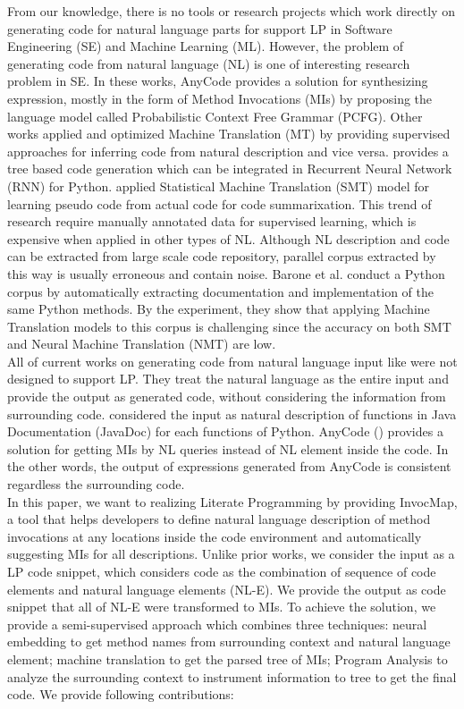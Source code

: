 \documentclass[sigconf,review,anonymous]{article}
\begin{document}
From our knowledge, there is no tools or research projects which work directly on generating code for natural language parts for support LP in Software Engineering (SE) and Machine Learning (ML). However, the problem of generating code from natural language (NL) is one of interesting research problem in SE. In these works, AnyCode \cite{007} provides a solution for synthesizing expression, mostly in the form of Method Invocations (MIs) by proposing the language model called Probabilistic Context Free Grammar (PCFG). Other works applied and optimized Machine Translation (MT) by providing supervised approaches for inferring code from natural description and vice versa. \cite{008} provides a tree based code generation which can be integrated in Recurrent Neural Network (RNN) for Python. \cite{009} applied Statistical Machine Translation (SMT) model for learning pseudo code from actual code for code summarixation. This trend of research require manually annotated data for supervised learning, which is expensive when applied in other types of NL. Although NL description and code can be extracted from large scale code repository, parallel corpus extracted by this way is usually erroneous and contain noise.  Barone  et al. \cite{010} conduct a Python corpus by automatically extracting documentation and implementation of the same Python methods. By the experiment, they show that applying Machine Translation models to this corpus is challenging since the accuracy on both SMT and Neural Machine Translation (NMT) are low.
\\
All of current works on generating code from natural language input like \cite{007,008,009,010} were not designed to support LP. They treat the natural language as the entire input and provide the output as generated code, without considering the information from surrounding code. \cite{010} considered the input as natural description of functions in Java Documentation (JavaDoc) for each functions of Python. AnyCode (\cite{007}) provides a solution for getting MIs by NL queries instead of NL element inside the code. In the other words, the output of expressions generated from AnyCode is consistent regardless the surrounding code.
\\
In this paper, we want to realizing Literate Programming by providing InvocMap, a tool that helps developers to define natural language description of method invocations at any locations inside the code environment and automatically suggesting MIs for all descriptions. Unlike prior works, we consider the input as a LP code snippet, which considers code as the combination of sequence of code elements and natural language elements (NL-E). We provide the output as code snippet that all of NL-E were transformed to MIs. To achieve the solution, we provide a semi-supervised approach which combines three techniques: neural embedding to get method names from surrounding context and natural language element; machine translation to get the parsed tree of MIs; Program Analysis to analyze the surrounding context to instrument information to tree to get the final code. We provide following contributions:
\end{document}

